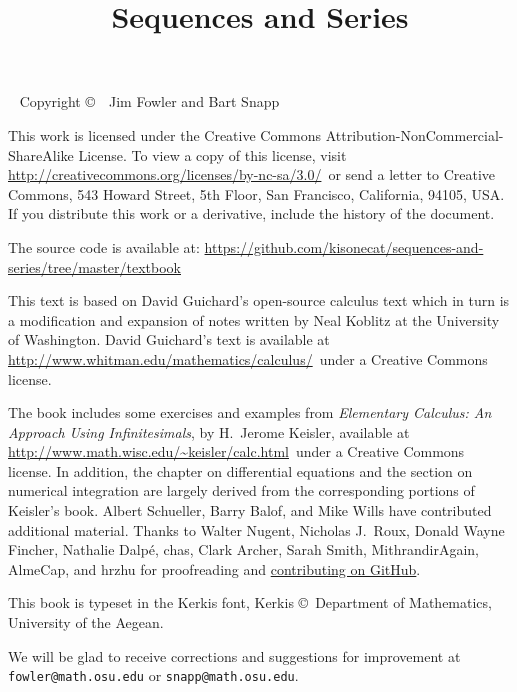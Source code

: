 \documentclass[justified]{tufte-book}
\title{Sequences and Series}
\begin{document}
\frontmatter

\maketitle

\pagebreak


\begin{fullwidth}
~\vfill
\thispagestyle{empty}
\setlength{\parindent}{0pt}
\setlength{\parskip}{\baselineskip}
Copyright \copyright\ \the\year\ Jim Fowler and Bart Snapp

This work is licensed under the Creative Commons
Attribution-NonCommercial-ShareAlike License. To view a copy of this
license, visit
\url{http://creativecommons.org/licenses/by-nc-sa/3.0/}~or send a
letter to Creative Commons, 543 Howard Street, 5th Floor, San
Francisco, California, 94105, USA. If you distribute this work or a
derivative, include the history of the document. 

The source code is available
at: \url{https://github.com/kisonecat/sequences-and-series/tree/master/textbook}

\noindent
This text is based on David Guichard's open-source calculus text which
in turn is a modification and expansion of notes written by Neal
Koblitz at the University of Washington. David Guichard's text is
available at \url{http://www.whitman.edu/mathematics/calculus/}~under a Creative Commons license.

\noindent The book includes some exercises and examples from {\it
  Elementary Calculus: An Approach Using Infinitesimals}, by H.~Jerome
Keisler, available at
\url{http://www.math.wisc.edu/~keisler/calc.html}~under a Creative
Commons license. In addition, the chapter on differential equations
and the section on numerical integration are largely derived from the
corresponding portions of Keisler's book.  Albert Schueller, Barry
Balof, and Mike Wills have contributed additional material.  Thanks to
Walter Nugent, Nicholas J.~Roux, Donald Wayne Fincher, Nathalie
Dalp\'e, chas, Clark Archer, Sarah Smith, MithrandirAgain, AlmeCap,
and hrzhu for proofreading and
\href{https://github.com/kisonecat/sequences-and-series/graphs/contributors}{contributing
  on GitHub}.

\noindent This book is typeset in the Kerkis font, 
Kerkis \copyright~Department of Mathematics, University of the Aegean.


\noindent We will be glad to receive corrections and suggestions for
improvement at \texttt{fowler@math.osu.edu} or
\texttt{snapp@math.osu.edu}.

\end{fullwidth}
\end{document}
